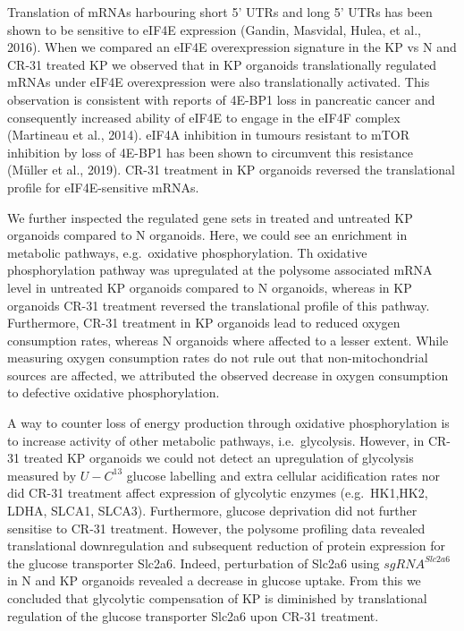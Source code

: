 \documentclass[
  12pt,
  openany]{book}
\begin{document}
Translation of mRNAs harbouring short 5' UTRs and long 5' UTRs has been shown to be sensitive to eIF4E expression (Gandin, Masvidal, Hulea, et al., 2016). When we compared an eIF4E overexpression signature in the KP vs N and CR-31 treated KP we observed that in KP organoids translationally regulated mRNAs under eIF4E overexpression were also translationally activated. This observation is consistent with reports of 4E-BP1 loss in pancreatic cancer and consequently increased ability of eIF4E to engage in the eIF4F complex (Martineau et al., 2014). eIF4A inhibition in tumours resistant to mTOR inhibition by loss of 4E-BP1 has been shown to circumvent this resistance (Müller et al., 2019). CR-31 treatment in KP organoids reversed the translational profile for eIF4E-sensitive mRNAs.

We further inspected the regulated gene sets in treated and untreated KP organoids compared to N organoids. Here, we could see an enrichment in metabolic pathways, e.g.~oxidative phosphorylation. Th oxidative phosphorylation pathway was upregulated at the polysome associated mRNA level in untreated KP organoids compared to N organoids, whereas in KP organoids CR-31 treatment reversed the translational profile of this pathway. Furthermore, CR-31 treatment in KP organoids lead to reduced oxygen consumption rates, whereas N organoids where affected to a lesser extent. While measuring oxygen consumption rates do not rule out that non-mitochondrial sources are affected, we attributed the observed decrease in oxygen consumption to defective oxidative phosphorylation.

A way to counter loss of energy production through oxidative phosphorylation is to increase activity of other metabolic pathways, i.e.~glycolysis. However, in CR-31 treated KP organoids we could not detect an upregulation of glycolysis measured by \(U-C^{13}\) glucose labelling and extra cellular acidification rates nor did CR-31 treatment affect expression of glycolytic enzymes (e.g.~HK1,HK2, LDHA, SLCA1, SLCA3). Furthermore, glucose deprivation did not further sensitise to CR-31 treatment. However, the polysome profiling data revealed translational downregulation and subsequent reduction of protein expression for the glucose transporter Slc2a6. Indeed, perturbation of Slc2a6 using \(sgRNA^{Slc2a6}\) in N and KP organoids revealed a decrease in glucose uptake. From this we concluded that glycolytic compensation of KP is diminished by translational regulation of the glucose transporter Slc2a6 upon CR-31 treatment.
\end{document}
